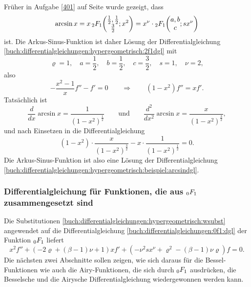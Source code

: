 \begin{beispiel}
Früher in Aufgabe \ref{401} auf Seite \pageref{401}
wurde gezeigt, dass 
\[
\arcsin x = x\,\mathstrut_2F_1\biggl(
\begin{matrix}\frac12,\frac12\\\frac32\end{matrix};x^2
\biggr)
=
x^\nu\cdot \mathstrut_2F_1\biggl(
\begin{matrix}a,b\\c\end{matrix};
sx^\nu
\biggr)
\]
ist.
Die Arkus-Sinus-Funktion ist daher Lösung der Differentialgleichung
\eqref{buch:differentialgleichungen:hypergeometrisch:2f1dgl}
mit
\[
\varrho=1,\quad
a=\frac12,\quad
b=\frac12,\quad
c=\frac32,\quad
s=1,\quad
\nu=2,
\]
also
\begin{equation}
-\frac{x^2-1}{x}f''
-f'
=
0
\qquad\Rightarrow\qquad
(1-x^2)f''=xf'.
\label{buch:differentialgleichungen:hypergeometrisch:beispiel:arcsindgl}
\end{equation}
Tatsächlich ist
\[
\frac{d}{dx}\arcsin x
=
\frac{1}{(1-x^2)^{\frac12}}
\qquad\text{und}\qquad
\frac{d^2}{dx^2} \arcsin x
=
\frac{x}{(1-x^2)^{\frac32}},
\]
und nach Einsetzen in die Differentialgleichung
\[
(1-x^2)
\cdot
\frac{x}{(1-x^2)^{\frac32}}
-
x
\cdot
\frac{1}{(1-x^2)^{\frac12}}
=
0.
\]
Die Arkus-Sinus-Funktion ist also eine Lösung der
%
Differentialgleichung
\eqref{buch:differentialgleichungen:hypergeometrisch:beispiel:arcsindgl}.
\end{beispiel}

%
%
%
\subsubsection{Differentialgleichung für Funktionen, die aus $\mathstrut_0F_1$ zusammengesetzt sind}
Die Substitutionen 
\eqref{buch:differentialgleichungen:hypergeometrisch:wsubst}
angewendet auf die Differentialgleichung
\eqref{buch:differentialgleichungen:0f1:dgl}
der Funktion $\mathstrut_0F_1$
liefert
%
\begin{equation}
x^2f''
+
(-2\varrho+(\beta-1)\nu+1)xf'
+
(-\nu^2sx^\nu + \varrho^2 -(\beta-1)\nu\varrho)f
=
0.
\label{buch:differentialgleichungen:0F1:dgl}
\end{equation}
Die nächsten zwei Abschnitte sollen zeigen, wie sich daraus für die
Bessel-Funktionen wie auch die Airy-Funktionen, die sich durch
$\mathstrut_0F_1$ ausdrücken, die Besselsche und die Airysche
Differentialgleichung wiedergewonnen werden kann.


